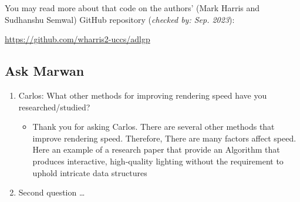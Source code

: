 You may read more about that code on the authors' (Mark Harris and Sudhanshu Semwal) GitHub repository (\textit{checked by: Sep. 2023}):

\url{https://github.com/wharris2-uccs/adlgp}

\subsection{Ask Marwan}

\begin{enumerate}[label={Question \arabic*.}]
    \item Carlos: What other methods for improving rendering speed have you researched/studied?
    \begin{itemize}
        \item Thank you for asking Carlos. There are several other methods that improve rendering speed. Therefore, There are many 
        factors affect speed. Here an example of a research paper that provide an Algorithm
        that produces interactive, high-quality lighting without the requirement to uphold 
        intricate data structures \cite{bitterli_spatiotemporal_2020}
    \end{itemize}
    \item Second question \dots
\end{enumerate}
